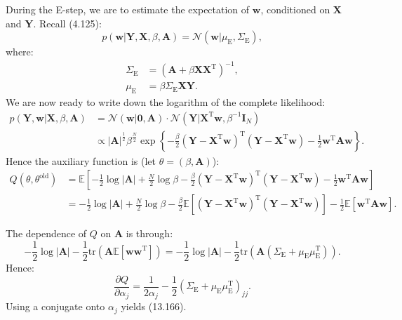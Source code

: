 \documentclass[UTF8]{ctexart}
\begin{document}
During the E-step, we are to estimate the expectation of $\textbf{w}$, conditioned on $\textbf{X}$ and $\textbf{Y}$.
Recall (4.125):
$$p(\textbf{w}|\textbf{Y},\textbf{X},\beta,\textbf{A})=\mathcal{N}(\textbf{w}|\mu_{\text{E}},\Sigma_{\text{E}}),$$
where:
$$
\begin{aligned}
\Sigma_{\text{E}}&=\left(\textbf{A}+\beta\textbf{X}\textbf{X}^{\text{T}} \right)^{-1},\\
\mu_{\text{E}}&=\beta\Sigma_{\text{E}}\textbf{X}\textbf{Y}.
\end{aligned}
$$
We are now ready to write down the logarithm of the complete likelihood:
$$
\begin{aligned}
p(\textbf{Y},\textbf{w}|\textbf{X},\beta,\textbf{A})&=\mathcal{N}(\textbf{w}|\textbf{0},\textbf{A})\cdot\mathcal{N}(\textbf{Y}|\textbf{X}^{\text{T}}\textbf{w},\beta^{-1}\textbf{I}_{N})\\
&\propto|\textbf{A}|^{\frac{1}{2}}\beta^{\frac{N}{2}}\exp\left\{-\frac{\beta}{2}\left(\textbf{Y}-\textbf{X}^{\text{T}}\textbf{w} \right)^{\text{T}}\left(\textbf{Y}-\textbf{X}^{\text{T}}\textbf{w} \right)-\frac{1}{2}\textbf{w}^{\text{T}}\textbf{A}\textbf{w} \right\}.
\end{aligned}
$$
Hence the auxiliary function is (let $\theta=(\beta,\textbf{A})$):
$$
\begin{aligned}
Q(\theta,\theta^{\text{old}})&= \mathbb{E}\left[-\frac{1}{2}\log |\textbf{A}|+\frac{N}{2}\log \beta-\frac{\beta}{2}\left(\textbf{Y}-\textbf{X}^{\text{T}}\textbf{w} \right)^{\text{T}}\left(\textbf{Y}-\textbf{X}^{\text{T}}\textbf{w} \right)-\frac{1}{2}\textbf{w}^{\text{T}}\textbf{A}\textbf{w} \right]\\
&=-\frac{1}{2}\log|\textbf{A}|+\frac{N}{2}\log \beta-\frac{\beta}{2}\mathbb{E}\left[\left(\textbf{Y}-\textbf{X}^{\text{T}}\textbf{w} \right)^{\text{T}}\left(\textbf{Y}-\textbf{X}^{\text{T}}\textbf{w} \right) \right]-\frac{1}{2}\mathbb{E}\left[\textbf{w}^{\text{T}}\textbf{A}\textbf{w} \right].
\end{aligned}
$$

The dependence of $Q$ on $\textbf{A}$ is through:
$$-\frac{1}{2}\log |\textbf{A}|-\frac{1}{2}\text{tr}\left(\textbf{A}\mathbb{E}[\textbf{w}\textbf{w}^{\text{T}}]\right)=-\frac{1}{2}\log |\textbf{A}|-\frac{1}{2}\text{tr}\left(\textbf{A}(\Sigma_{\text{E}}+\mu_{\text{E}}\mu_{\text{E}}^{\text{T}})\right).$$
Hence:
$$\frac{\partial Q}{\partial \alpha_{j}}=\frac{1}{2\alpha_{j}}-\frac{1}{2}(\Sigma_{\text{E}}+\mu_{\text{E}}\mu_{\text{E}}^{\text{T}})_{jj}.$$
Using a conjugate onto $\alpha_{j}$ yields (13.166).
\end{document}
